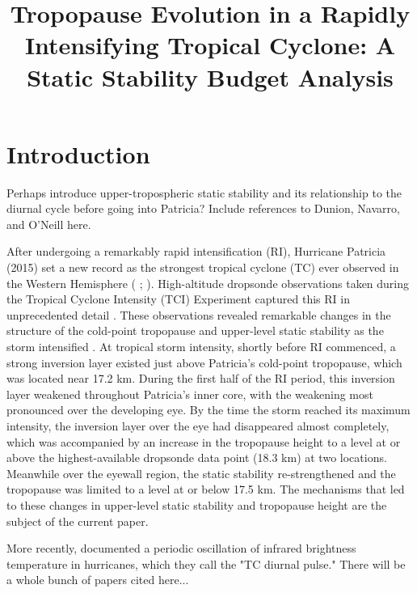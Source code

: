 \documentclass{ametsoc}
\title{Tropopause Evolution in a Rapidly Intensifying Tropical Cyclone: A Static Stability Budget Analysis}
\affiliation{University at Albany, State University of New York,
Albany, NY}
\begin{document}
\maketitle


%

 \section{Introduction}

Perhaps introduce upper-tropospheric static stability and its relationship to the diurnal cycle before going into Patricia? Include references to Dunion, Navarro, and O'Neill here.

After undergoing a remarkably rapid intensification (RI), Hurricane Patricia (2015) set a new record as the strongest tropical cyclone (TC) ever observed in the Western Hemisphere (\citeauthor{Kimberlainetal2016} \citeyear{Kimberlainetal2016}; \citeauthor{Rogersetal2017} \citeyear{Rogersetal2017}).
High-altitude dropsonde observations taken during the Tropical Cyclone Intensity (TCI) Experiment captured this RI in unprecedented detail \citep{DoyleTCI}.
These observations revealed remarkable changes in the structure of the cold-point tropopause and upper-level static stability as the storm intensified \citep{Duran+Molinari2018}.
At tropical storm intensity, shortly before RI commenced, a strong inversion layer existed just above Patricia's cold-point tropopause, which was located near 17.2 km.
During the first half of the RI period, this inversion layer weakened throughout Patricia's inner core, with the weakening most pronounced over the developing eye.
By the time the storm reached its maximum intensity, the inversion layer over the eye had disappeared almost completely, which was accompanied by an increase in the tropopause height to a level at or above the highest-available dropsonde data point (18.3 km) at two locations.
Meanwhile over the eyewall region, the static stability re-strengthened and the tropopause was limited to a level at or below 17.5 km.
The mechanisms that led to these changes in upper-level static stability and tropopause height are the subject of the current paper.

More recently, \cite{Dunionetal2014} documented a periodic oscillation of infrared brightness temperature in hurricanes, which they call the "TC diurnal pulse."
There will be a whole bunch of papers cited here...
\end{document}
